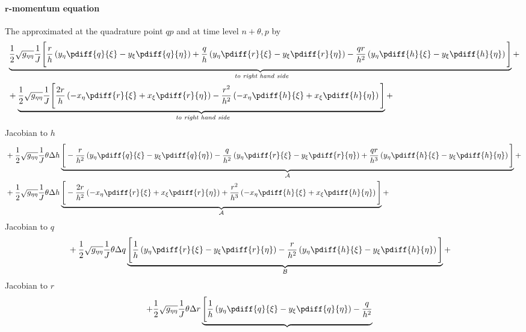 \paragraph*{$\bm r$-momentum equation}
The approximated at the quadrature point $qp$ and at time level ${n+\theta, p}$ by
{\small
\begin{align}
    & \underbrace{ \half \sqrt{g_{\eta\eta}} \Jinv \Bigg[
    \frac{r}{h}
    \left( y_\eta \pdiff{q}{\xi} - y_\xi \pdiff{q}{\eta}  \right)
    + \frac{q}{h}
    \left( y_\eta \pdiff{r}{\xi} - y_\xi \pdiff{r}{\eta}  \right)
    - \frac{qr}{h^2}
    \left( y_\eta \pdiff{h}{\xi} - y_\xi \pdiff{h}{\eta}  \right)
    \Bigg]}_{\textit{ to right hand side}} +
    \\*
    & + \underbrace{ \half \sqrt{g_{\eta\eta}} \Jinv \Bigg[
        \frac{2r}{h}
        \left( -x_\eta \pdiff{r}{\xi} + x_\xi \pdiff{r}{\eta}  \right)
        - \frac{r^2}{h^2}
        \left( - x_\eta \pdiff{h}{\xi} + x_\xi \pdiff{h}{\eta}  \right)
        \Bigg]}_{\textit{ to right hand side}} +
\end{align}
Jacobian to $h$
\begin{align}
    & + \half \sqrt{g_{\eta\eta}} \Jinv \theta \Dh \underbrace{\Bigg[
        -\frac{r}{h^2}
        \left( y_\eta \pdiff{q}{\xi} - y_\xi \pdiff{q}{\eta}  \right)
        - \frac{q}{h^2}
        \left( y_\eta \pdiff{r}{\xi} - y_\xi \pdiff{r}{\eta}  \right)
        + \frac{qr}{h^3}
        \left( y_\eta \pdiff{h}{\xi} - y_\xi \pdiff{h}{\eta}  \right)
        \Bigg]}_{\cal{A}} +
    \\*
    & + \half \sqrt{g_{\eta\eta}} \Jinv \theta \Dh  \underbrace{
    \Bigg[
    -\frac{2r}{h^2}
    \left( -x_\eta \pdiff{r}{\xi} + x_\xi \pdiff{r}{\eta}  \right)
    + \frac{r^2}{h^3}
    \left( - x_\eta \pdiff{h}{\xi} + x_\xi \pdiff{h}{\eta}  \right)
    \Bigg]}_{\cal A} +
    \\
\end{align}
Jacobian to $q$
\begin{align}
& + \half \sqrt{g_{\eta\eta}} \Jinv \theta \Dq \underbrace{\Bigg[
    \frac{1}{h}
    \left( y_\eta \pdiff{r}{\xi} - y_\xi \pdiff{r}{\eta}  \right)
    - \frac{r}{h^2}
    \left( y_\eta \pdiff{h}{\xi} -y_\xi \pdiff{h}{\eta}  \right)
    \Bigg]}_{\cal B} +
\end{align}
Jacobian to $r$
\begin{align}
    + & \half \sqrt{g_{\eta\eta}} \Jinv \theta \Dr \underbrace{\Bigg[
        \frac{1}{h}
        \left( y_\eta \pdiff{q}{\xi} - y_\xi \pdiff{q}{\eta}  \right)
        - \frac{q}{h^2}
}
\end{align}}
